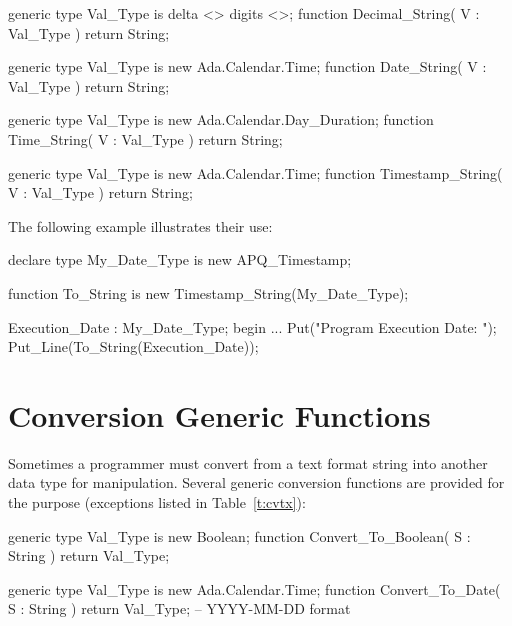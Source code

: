 \documentclass[english,letterpaper]{book}
\begin{document}
\begin{Code}
generic
   type Val_Type is delta <> digits <>;
function Decimal_String(
   V : Val_Type
) return String;
\end{Code}

\begin{Code}
generic
   type Val_Type is new Ada.Calendar.Time;
function Date_String(
   V : Val_Type
) return String;
\end{Code}

\begin{Code}
generic
   type Val_Type is new Ada.Calendar.Day_Duration;
function Time_String(
   V : Val_Type
) return String;
\end{Code}

\begin{Code}
generic
   type Val_Type is new Ada.Calendar.Time;
function Timestamp_String(
   V : Val_Type
) return String;
\end{Code}

The following example illustrates their use:

\begin{Example}
declare
   type My_Date_Type is new APQ_Timestamp;

   function To_String is new 
      Timestamp_String(My_Date_Type);

   Execution_Date : My_Date_Type;
begin
   ...
   Put("Program Execution Date: ");
   Put_Line(To_String(Execution_Date));
\end{Example}

\section{Conversion Generic Functions}

Sometimes a programmer must convert from a text format string into
another data type for manipulation. Several generic conversion  functions are
provided for the purpose (exceptions listed in Table~\ref{t:cvtx}):

\begin{Code}
generic
   type Val_Type is new Boolean;
function Convert_To_Boolean(
   S : String
) return Val_Type;
\end{Code}

\begin{Code}
generic
   type Val_Type is new Ada.Calendar.Time;
function Convert_To_Date(
   S : String
) return Val_Type; -- YYYY-MM-DD format
\end{Code}
\end{document}
